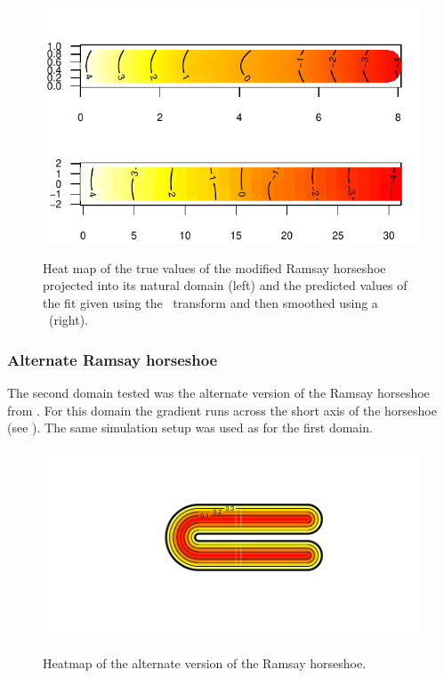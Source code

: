 \begin{figure}
\centering
\includegraphics{sc/figs/hsvisgam.pdf} \\
\caption{Heat map of the true values of the modified Ramsay horseshoe projected into its natural domain (left) and the predicted values of the fit given using the \sch\ transform and then smoothed using a \tprs\ (right).}
\label{hsvisgam}
\end{figure}

\subsubsection{Alternate Ramsay horseshoe}

The second domain tested was the alternate version of the Ramsay horseshoe from \cite{soap}. For this domain the gradient runs across the short axis of the horseshoe (see ). The same simulation setup was used as for the first domain.

\begin{figure}
\centering
\includegraphics[trim=0.5in 1in 0in 0.5in]{sc/figs/altramsayhorseshoe.pdf} \\
\caption{Heatmap of the alternate version of the Ramsay horseshoe.}
\label{altramsayhorseshoe}
\end{figure}

